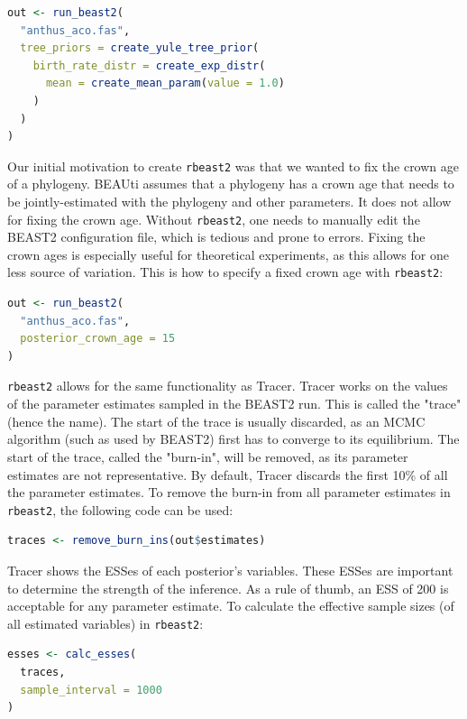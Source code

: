 \documentclass{article}
\begin{document}
\begin{lstlisting}[language=R, floatplacement=H]
out <- run_beast2(
  "anthus_aco.fas",
  tree_priors = create_yule_tree_prior(
    birth_rate_distr = create_exp_distr(
      mean = create_mean_param(value = 1.0)
    )    
  )
)
\end{lstlisting}

Our initial motivation to create \verb;rbeast2; 
was that we wanted to fix the crown age of a phylogeny.
BEAUti assumes that a phylogeny has a crown age that needs to be jointly-estimated
with the phylogeny and other parameters. It does not allow for fixing
the crown age. Without \verb;rbeast2;, one needs to manually edit the BEAST2 
configuration file, which is tedious and prone to errors. 
Fixing the crown ages is especially useful for theoretical experiments,
as this allows for one less source of variation.
This is how to specify a fixed crown age with \verb;rbeast2;:

\begin{lstlisting}[language=R, floatplacement=H]
out <- run_beast2(
  "anthus_aco.fas",
  posterior_crown_age = 15
)
\end{lstlisting}

\verb;rbeast2; allows for the same functionality as Tracer.
Tracer works on the values of the parameter estimates sampled
in the BEAST2 run. This is called the "trace" (hence the name).
The start of the trace is usually discarded, as an MCMC 
algorithm (such as used by BEAST2) first has to converge to
its equilibrium. The start of the trace, called the "burn-in", 
will be removed, as its parameter estimates are not 
representative. By default, Tracer discards the first 10\% of all 
the parameter estimates. 
To remove the burn-in from all parameter estimates in \verb;rbeast2;,
the following code can be used:

\begin{lstlisting}[language=R, floatplacement=H]
traces <- remove_burn_ins(out$estimates)
\end{lstlisting}

Tracer shows the ESSes of each posterior's variables.
These ESSes are important to determine the strength of the
inference. As a rule of thumb, an ESS of 200 is acceptable 
for any parameter estimate.
To calculate the effective sample sizes (of all estimated variables) in \verb;rbeast2;:

\begin{lstlisting}[language=R, floatplacement=H]
esses <- calc_esses(
  traces, 
  sample_interval = 1000
)
\end{lstlisting}
\end{document}
